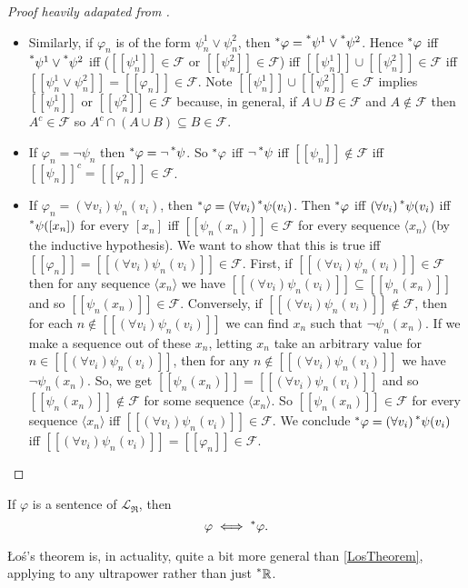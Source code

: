 \begin{proof}[Proof heavily adapated from ]
\begin{itemize}
        \item Similarly, if $\varphi_n$ is of the form $\psi^1_n \lor \psi^2_n$, then $\prescript{*}{}{\varphi} = \prescript{*}{}{\psi^1} \lor \prescript{*}{}{\psi^2}$. Hence $\prescript{*}{}{\varphi}$ iff $\prescript{*}{}{\psi^1} \lor \prescript{*}{}{\psi^2}$ iff ($[[\psi^1_n]] \in \mathcal {F}$ or $[[\psi^2_n]] \in \mathcal{F}$) iff $[[\psi^1_n]] \cup [[\psi^2_n]] \in \mathcal{F}$ iff $[[\psi^1_n \lor \psi^2_n]] = [[\varphi_n]] \in \mathcal{F}$. Note $[[\psi^1_n]] \cup [[\psi^2_n]] \in \mathcal{F}$ implies $[[\psi^1_n]]$ or $[[\psi^2_n]] \in \mathcal{F}$ because, in general, if $A \cup B \in \mathcal{F}$ and $A \notin \mathcal{F}$ then $A^c \in \mathcal{F}$ so $A^c \cap (A \cup B) \subseteq B \in \mathcal{F}$.
        
        \item If $\varphi_n = \neg \psi_n$ then $\prescript{*}{}{\varphi} = \neg \prescript{*}{}{\psi}$. So $\prescript{*}{}{\varphi}$ iff $\neg \prescript{*}{}{\psi}$ iff $[[\psi_n]] \notin \mathcal{F}$ iff $[[\psi_n]]^c = [[\varphi_n]] \in \mathcal{F}$.
        
        \item If $\varphi_n = (\forall v_i)\psi_n(v_i)$, then $\prescript{*}{}{\varphi} = (\forall v_i) \prescript{*}{}{\psi}(v_i)$. Then $\prescript{*}{}{\varphi}$ iff $(\forall v_i)\prescript{*}{}{\psi}(v_i)$ iff $\prescript{*}{}{\psi}([x_n])$ for every $[x_n]$ iff $[[\psi_n(x_n)]] \in \mathcal{F}$ for every sequence $\langle x_n \rangle$ (by the inductive hypothesis). We want to show that this is true iff $[[\varphi_n]] = [[(\forall v_i)\psi_n(v_i)]] \in \mathcal{F}$. First, if $[[(\forall v_i)\psi_n(v_i)]] \in \mathcal{F}$ then for any sequence $\langle x_n \rangle$ we have $[[(\forall v_i)\psi_n(v_i)]] \subseteq [[\psi_n(x_n)]]$ and so $[[\psi_n(x_n)]] \in \mathcal{F}$. Conversely, if $[[(\forall v_i)\psi_n(v_i)]] \notin \mathcal{F}$, then for each $n \notin [[(\forall v_i)\psi_n(v_i)]]$ we can find $x_n$ such that $\neg \psi_n(x_n)$. If we make a sequence out of these $x_n$, letting $x_n$ take an arbitrary value for $n \in [[(\forall v_i)\psi_n(v_i)]]$, then for any $n \notin [[(\forall v_i)\psi_n(v_i)]]$ we have $\neg \psi_n(x_n)$. So, we get $[[\psi_n(x_n)]] = [[(\forall v_i)\psi_n(v_i)]]$ and so $[[\psi_n(x_n)]] \notin \mathcal{F}$ for some sequence $\langle x_n \rangle$. So $[[\psi_n(x_n)]] \in \mathcal{F}$ for every sequence $\langle x_n \rangle$ iff $[[(\forall v_i)\psi_n(v_i)]] \in \mathcal{F}$. We conclude $\prescript{*}{}{\varphi} = (\forall v_i)\prescript{*}{}{\psi}(v_i)$ iff $[[(\forall v_i)\psi_n(v_i)]] = [[\varphi_n]] \in \mathcal{F}$.
    \end{itemize}
\end{proof}

\begin{corollary}\label{transferPrinciple}
    If $\varphi$ is a sentence of $\mathcal{L}_\mathfrak{R}$, then
    \[ \varphi \iff \prescript{*}{}{\varphi}. \]
\end{corollary}

\L o\'s's theorem is, in actuality, quite a bit more general than \ref{LosTheorem}, applying to any ultrapower rather than just $\prescript{*}{}{\mathbb{R}}$. 
